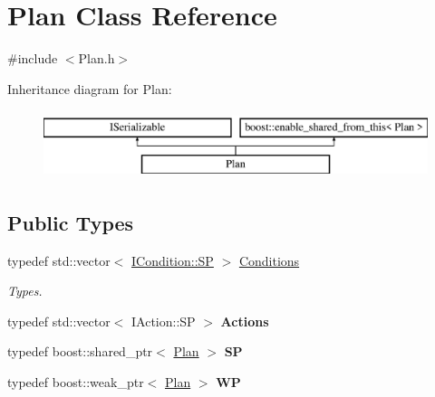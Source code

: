 \hypertarget{class_plan}{}\section{Plan Class Reference}
\label{class_plan}


{\ttfamily \#include $<$Plan.\+h$>$}

Inheritance diagram for Plan\+:\begin{figure}[H]
\begin{center}
\leavevmode
\includegraphics[height=2.000000cm]{class_plan}
\end{center}
\end{figure}
\subsection*{Public Types}
\begin{DoxyCompactItemize}
\item 
\mbox{\label{class_plan_aa0455bd3e1ec9a820f31ef52706fdf76}} 
typedef std\+::vector$<$ \hyperlink{class_i_condition_a9e52c5b905c336e61daf97bc3f10def8}{I\+Condition\+::\+SP} $>$ \hyperlink{class_plan_aa0455bd3e1ec9a820f31ef52706fdf76}{Conditions}
\begin{DoxyCompactList}\small\item\em Types. \end{DoxyCompactList}\item 
\mbox{\label{class_plan_a0697d1681ecf56500f2576b09887f3e3}} 
typedef std\+::vector$<$ I\+Action\+::\+SP $>$ {\bfseries Actions}
\item 
\mbox{\label{class_plan_a7040be830f0b76cf33cfaa4b5d30fb8c}} 
typedef boost\+::shared\+\_\+ptr$<$ \hyperlink{class_plan}{Plan} $>$ {\bfseries SP}
\item 
\mbox{\label{class_plan_a8c525bf942121ad5ffd59f87c843525c}} 
typedef boost\+::weak\+\_\+ptr$<$ \hyperlink{class_plan}{Plan} $>$ {\bfseries WP}
\end{DoxyCompactItemize}
